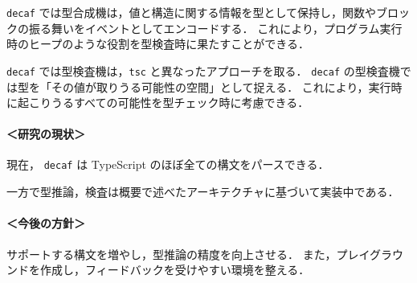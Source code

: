 \documentclass[dvipdfmx]{classes/tyukan}
\begin{document}
\texttt{decaf} では型合成機は，値と構造に関する情報を型として保持し，関数やブロックの振る舞いをイベントとしてエンコードする．
これにより，プログラム実行時のヒープのような役割を型検査時に果たすことができる．

\texttt{decaf} では型検査機は，\texttt{tsc} と異なったアプローチを取る．
\texttt{decaf} の型検査機では型を「その値が取りうる可能性の空間」として捉える．
これにより，実行時に起こりうるすべての可能性を型チェック時に考慮できる．

\paragraph{＜研究の現状＞}
現在， \texttt{decaf} は TypeScript のほぼ全ての構文をパースできる．

一方で型推論，検査は概要で述べたアーキテクチャに基づいて実装中である．

\paragraph{＜今後の方針＞}
サポートする構文を増やし，型推論の精度を向上させる．
また，プレイグラウンドを作成し，フィードバックを受けやすい環境を整える．
\end{document}
